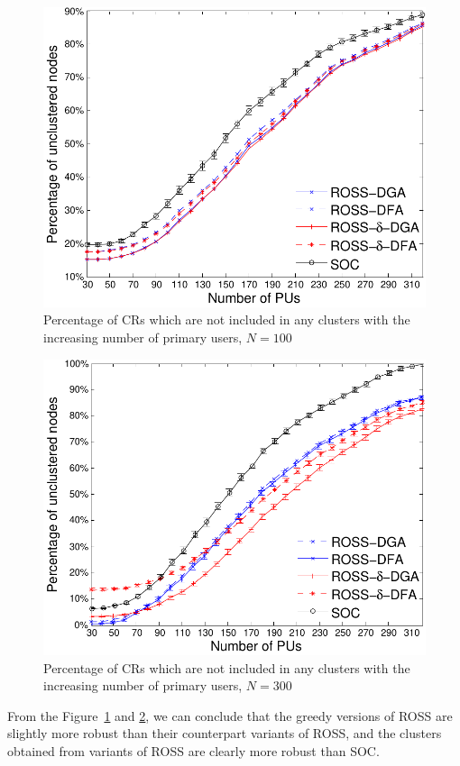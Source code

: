 \documentclass[10pt,journal,compsoc]{IEEEtran}
\theoremstyle{mytheoremstyle}
\theoremstyle{mytheoremstyle}
\theoremstyle{mytheoremstyle}
\begin{document}
\begin{figure}[!h]
  \centering
  \includegraphics[width=0.8\linewidth]{survival_rate_100.pdf}
  \caption{Percentage of CRs which are not included in any clusters with the increasing number of primary users, $N=100$}
  \label{singleton_clusters_100}
\end{figure}
  
  \begin{figure}[!h]
    \centering
   \includegraphics[width=0.8\linewidth]{survival_rate_300.pdf}
  \caption{Percentage of CRs which are not included in any clusters with the increasing number of primary users, $N=300$}
  \label{singleton_clusters_300}
\end{figure}

From the Figure~\ref{singleton_clusters_100} and \ref{singleton_clusters_300}, we can conclude that the greedy versions of ROSS are slightly more robust than their counterpart variants of ROSS, and the clusters obtained from variants of ROSS are clearly more robust than SOC. 
\end{document}
